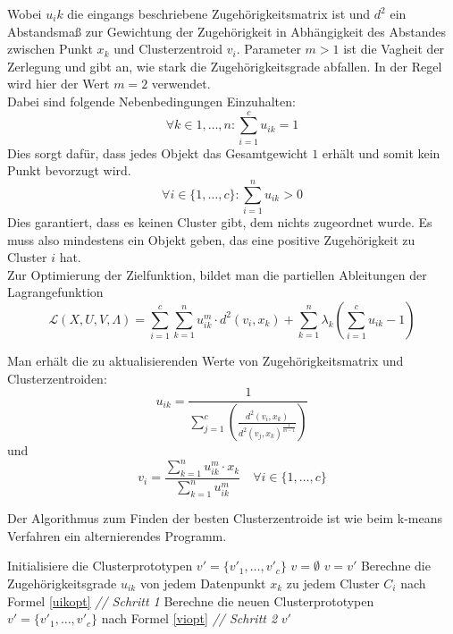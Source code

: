 \documentclass[11pt,ceqn]{book}
\begin{document}
Wobei $u_ik$ die eingangs beschriebene Zugehörigkeitsmatrix ist und $d^2$ ein Abstandsmaß zur Gewichtung der Zugehörigkeit in Abhängigkeit des Abstandes zwischen Punkt $x_k$ und Clusterzentroid $v_i$. Parameter $m>1$ ist die Vagheit der Zerlegung und gibt an, wie stark die Zugehörigkeitsgrade abfallen. In der Regel wird hier der Wert $m=2$ verwendet.
\\
Dabei sind folgende Nebenbedingungen Einzuhalten:
$$\forall k \in {1, \dots, n} : \sum_{i=1}^c u_{ik} = 1$$
Dies sorgt dafür, dass jedes Objekt das Gesamtgewicht $1$ erhält und somit kein Punkt bevorzugt wird.
$$\forall i \in \{1, \dots, c\} : \sum_{i=1}^n u_{ik} > 0$$
Dies garantiert, dass es keinen Cluster gibt, dem nichts zugeordnet wurde. Es muss also mindestens ein Objekt geben, das eine positive Zugehörigkeit zu Cluster $i$ hat.
\\
Zur Optimierung der Zielfunktion, bildet man die partiellen Ableitungen der Lagrangefunktion 
$$\mathcal{L}(X, U, V , \Lambda) = \sum_{i=1}^{c} \sum_{k=1}^{n} u_{ik}^m \cdot d^2(v_i,x_k) + \sum_{k=1}^n \lambda_k \left(\sum_{i=1}^c u_{ik} - 1\right)$$

Man erhält die zu aktualisierenden Werte von Zugehörigkeitsmatrix und Clusterzentroiden:
\begin{equation} \label{uikopt}
u_{ik} = \frac{1}{\sum\limits_{j=1}^c \left(\frac{d^2(v_i, x_k)}{d^2(v_j, x_k)^{\frac{1}{m-1}}}\right)}
\end{equation}
und
\begin{equation} \label{viopt}
v_i = \frac{\sum\limits_{k=1}^n u_{ik}^m \cdot x_k}{\sum\limits_{k=1}^n u_{ik}^m}  \quad \forall i \in \{1, \dots, c\}
\end{equation}


Der Algorithmus zum Finden der besten Clusterzentroide ist wie beim k-means Verfahren ein alternierendes Programm.
\begin{algorithm}[H]
\caption{$FCM(X,c,m,\epsilon)$}\label{fcm}
\begin{algorithmic}[1]
\State Initialisiere die Clusterprototypen $v' = \{v'_1, \dots, v'_c\}$
\State $v = \emptyset$
\Repeat
\State $v=v'$
\State Berechne die Zugehörigkeitsgrade $u_{ik}$ von jedem Datenpunkt $x_k$ zu jedem Cluster $C_i$ nach \hspace*{5mm} Formel \eqref{uikopt} \textit{// Schritt 1}
\State Berechne die neuen Clusterprototypen $v' = \{v'_1, \dots, v'_c\}$ nach Formel \eqref{viopt} \textit{// Schritt 2}
\State \Return $v'$
\end{algorithmic}
\end{algorithm}
\end{document}
